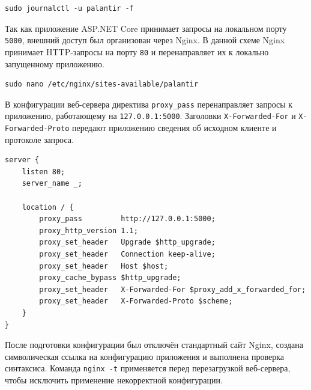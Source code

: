 \begin{code}
\vspace{-0.75cm}
\begin{verbatim}
sudo journalctl -u palantir -f
\end{verbatim}
\end{code}

Так как приложение ASP.NET Core принимает запросы на локальном порту \texttt{5000}, внешний доступ был организован через Nginx. В данной схеме Nginx принимает HTTP-запросы на порту \texttt{80} и перенаправляет их к локально запущенному приложению.

\begin{code}
\vspace{-0.75cm}
\begin{verbatim}
sudo nano /etc/nginx/sites-available/palantir
\end{verbatim}
\end{code}

В конфигурации веб-сервера директива \texttt{proxy\_pass} перенаправляет запросы к приложению, работающему на \texttt{127.0.0.1:5000}. Заголовки \texttt{X-Forwarded-For} и \texttt{X-Forwarded-Proto} передают приложению сведения об исходном клиенте и протоколе запроса.

\begin{code}
\vspace{-0.75cm}
\begin{verbatim}
server {
    listen 80;
    server_name _;

    location / {
        proxy_pass         http://127.0.0.1:5000;
        proxy_http_version 1.1;
        proxy_set_header   Upgrade $http_upgrade;
        proxy_set_header   Connection keep-alive;
        proxy_set_header   Host $host;
        proxy_cache_bypass $http_upgrade;
        proxy_set_header   X-Forwarded-For $proxy_add_x_forwarded_for;
        proxy_set_header   X-Forwarded-Proto $scheme;
    }
}
\end{verbatim}
\end{code}

После подготовки конфигурации был отключён стандартный сайт Nginx, создана символическая ссылка на конфигурацию приложения и выполнена проверка синтаксиса. Команда \texttt{nginx -t} применяется перед перезагрузкой веб-сервера, чтобы исключить применение некорректной конфигурации.

